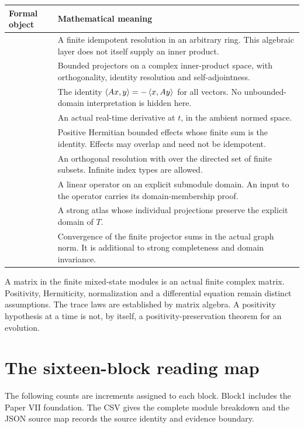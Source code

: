 \begin{longtable}{@{}L{.29\textwidth}L{.64\textwidth}@{}}
\toprule
Formal object & Mathematical meaning\\
\midrule
\endhead
{} & A finite idempotent resolution in an arbitrary ring. This algebraic layer does not itself supply an inner product.\\[3pt]
 & Bounded projectors on a complex inner-product space, with orthogonality, identity resolution and self-adjointness.\\[3pt]
 & The identity \(\left\langle Ax,y\right\rangle=-\left\langle x,Ay\right\rangle\) for all vectors. No unbounded-domain interpretation is hidden here.\\[3pt]
 & An actual real-time derivative at \(t\), in the ambient normed space.\\[3pt]
 & Positive Hermitian bounded effects whose finite sum is the identity. Effects may overlap and need not be idempotent.\\[3pt]
 & An orthogonal resolution with  over the directed set of finite subsets. Infinite index types are allowed.\\[3pt]
 & A linear operator on an explicit submodule domain. An input to the operator carries its domain-membership proof.\\[3pt]
 & A strong atlas whose individual projections preserve the explicit domain of \(T\).\\[3pt]
 & Convergence of the finite projector sums in the actual graph norm. It is additional to strong completeness and domain invariance.\\
\bottomrule
\end{longtable}

A matrix in the finite mixed-state modules is an actual finite complex matrix. Positivity, Hermiticity, normalization and a differential equation remain distinct assumptions. The trace laws are established by matrix algebra. A positivity hypothesis at a time is not, by itself, a positivity-preservation theorem for an evolution.

\section{The sixteen-block reading map}

The following counts are increments assigned to each block. Block1 includes the Paper VII foundation. The CSV gives the complete module breakdown and the JSON source map records the source identity and evidence boundary.

